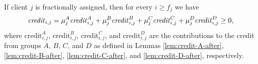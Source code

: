 \begin{lemma}\label{lem:credit-fractional-after}
    If client $j$ is fractionally assigned, then for every $i \geq f_j$ we have
    \begin{equation*}
        \text{\emph{credit}}_{i,j}
        = \mu_j^A \text{\emph{credit}}_{i,j}^A 
        + \mu_j^B \text{\emph{credit}}_{i,j}^B 
        + \mu_j^C \text{\emph{credit}}_{i,j}^C
        + \mu_j^D \text{\emph{credit}}_{i,j}^D \ge 0,
    \end{equation*}
    where $\text{credit}_{i,j}^A$, $\text{credit}_{i,j}^B$, $\text{credit}_{i,j}^C$, and $\text{credit}_{i,j}^D$ are the contributions to the credit from groups $A$, $B$, $C$, and $D$ as defined in Lemmas \ref{lem:credit-A-after}, \ref{lem:credit-B-after}, \ref{lem:credit-C-after}, and \ref{lem:credit-D-after}, respectively.
\end{lemma}
